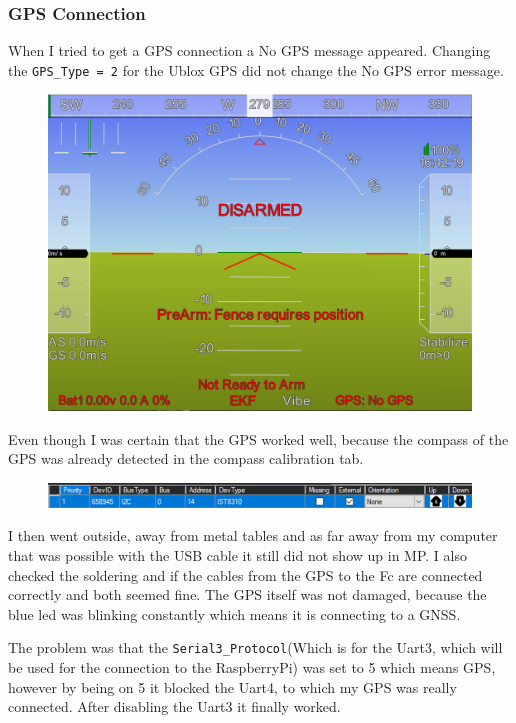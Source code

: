 \documentclass{article}
\begin{document}
	\subsubsection{GPS Connection}
	When I tried to get a GPS connection a No GPS message appeared. Changing the \lstinline|GPS_Type = 2| for the Ublox GPS did not change the No GPS error message.
\begin{figure}[h]
	\centering
	\includegraphics[scale=0.2]{pictures/No_GPS}
	\caption{}
	\label{fig:nogps}
\end{figure}

	Even though I was certain that the GPS worked well, because the compass of the GPS was already detected in the compass calibration tab.
\begin{figure}[h]
	\centering
	\includegraphics[width=0.7\linewidth]{pictures/M10_compass_detected}
	\caption{}
	\label{fig:m10compassdetected}
\end{figure}

	I then went outside, away from metal tables and as far away from my computer that was possible with the USB cable it still did not show up in MP. I also checked the soldering and if the cables from the GPS to the Fc are connected correctly and both seemed fine. The GPS itself was not damaged, because the blue led was blinking constantly which means it is connecting to a GNSS.

	The problem was that the \lstinline|Serial3_Protocol|(Which is for the Uart3, which will be used for the connection to the RaspberryPi) was set to 5 which means GPS, however by being on 5 it blocked the Uart4, to which my GPS was really connected. After disabling the Uart3 it finally worked.
\end{document}
